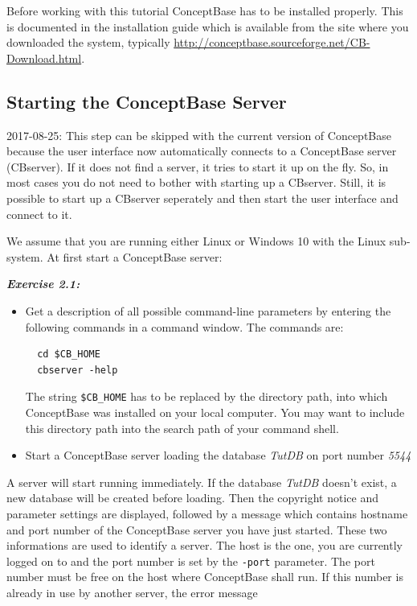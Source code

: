 \documentclass[10pt,a4paper]{article}
\begin{document}
Before working with this tutorial ConceptBase has to be installed
properly. This is documented in the installation guide which is available from
the site where you downloaded the system, typically
\url{http://conceptbase.sourceforge.net/CB-Download.html}.

\newpage
\subsection{Starting the ConceptBase Server}

{\scriptsize
2017-08-25: This step can be skipped with the current version of ConceptBase because
the user interface now automatically connects to a ConceptBase server (CBserver).
If it does not find a server, it tries to start it up on the fly.
So, in most cases you do not need to bother with starting up a CBserver.
Still, it is possible to start up a CBserver seperately and then start the
user interface and connect to it. 
}
\newline


We assume that you are running either Linux or Windows 10 with the Linux sub-system.
At first start a ConceptBase server: \\

\vspace{0.2cm}
{\it
{\bf Exercise 2.1:}
\begin{itemize}
\item[a)] Get a description of all possible command-line parameters
by entering the following commands in a command window. The commands are:
\begin{verbatim}
  cd $CB_HOME
  cbserver -help
\end{verbatim}


The string {\tt \$CB\_HOME} has to be replaced by the directory path,
into which ConceptBase was installed on your local computer. You may want
to include this directory path into the search path of your command shell.

\item[b)] Start a ConceptBase server loading the
   database {\em TutDB} on port number {\em 5544}
\end{itemize}
}


A server will start running immediately. If the database {\em TutDB}
doesn't exist, a new database will be created before loading. Then
the copyright notice and parameter settings are displayed, followed
by a message which contains hostname and port number of the ConceptBase
server you have just started. These two informations are used to
identify a server. The host is the one, you are currently logged on to
and the port number is set by the {\tt -port} parameter. The port number
must be free on the host where ConceptBase shall run.
If this number is already in use by another server, the error message \\
\end{document}

